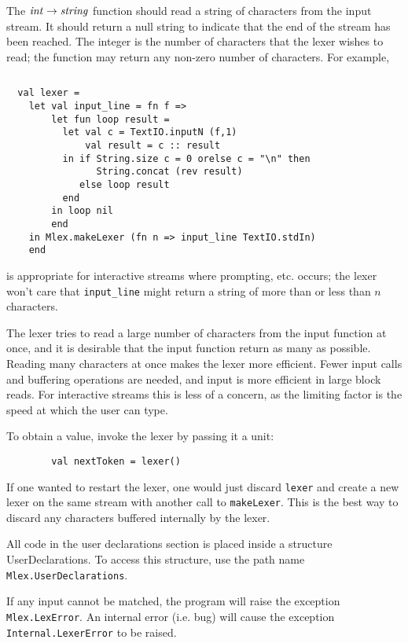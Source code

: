\documentclass{article}
\begin{document}
The ${\it int} \rightarrow {\it string}$ function
should read a string of characters
from the input stream.  It should return a null string to indicate
that the end of the stream has been reached.  The integer is the
number of characters that the lexer wishes to read; the function may
return any non-zero number of characters.  For example, 
\begin{verbatim}

\end{verbatim}

\begin{verbatim}
  val lexer =
    let val input_line = fn f =>
        let fun loop result =
          let val c = TextIO.inputN (f,1)
              val result = c :: result
          in if String.size c = 0 orelse c = "\n" then
                String.concat (rev result)
             else loop result
          end
        in loop nil
        end
    in Mlex.makeLexer (fn n => input_line TextIO.stdIn)
    end
\end{verbatim}

is appropriate for interactive streams where prompting, etc.  occurs;
the lexer won't care that \verb|input_line| might return a string of more
than or less than $n$ characters.

The lexer tries to read a large number of characters from the input
function at once, and it is desirable that the input function return
as many as possible.  Reading many characters at once makes the lexer
more efficient.  Fewer input calls and buffering operations are
needed, and input is more efficient in large block reads.  For
interactive streams this is less of a concern, as the limiting factor
is the speed at which the user can type.

To obtain a value, invoke the lexer by passing it a unit:

\begin{verbatim}
        val nextToken = lexer()
\end{verbatim}

If one wanted to restart the lexer, one would just discard {\tt lexer}
and create a new lexer on the same stream with another call to
{\tt makeLexer}.  This is the best way to discard any characters buffered
internally by the lexer.

All code in the user declarations section is placed inside a
structure UserDeclarations.  To access this structure, use the path name
{\tt Mlex.UserDeclarations}.

If any input cannot be matched, the program will raise the exception
{\tt Mlex.LexError}.  An internal error (i.e.  bug) will cause the
exception {\tt Internal.LexerError} to be raised.
\end{document}
